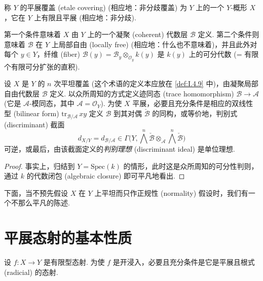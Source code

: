 \begin{definition}\label{def:I.4.9}
称 $Y$ 的平展覆盖 (etale covering) (相应地：非分歧覆盖) 为 $Y$ 上的一个 $Y$-概形 $X$，它在 $Y$ 上有限且平展 (相应地：非分歧).
\end{definition}

第一个条件意味着 $X$ 由 $Y$ 上的一个凝聚 (coherent) 代数层 $\mathcal{B}$ 定义. 第二个条件则意味着 $\mathcal{B}$ 在 $Y$ 上局部自由 (locally free) (相应地：什么也不意味着)，并且此外对每个 $y \in Y$，纤维 (fiber) $\mathcal{B}(y) = \mathcal{B}_y \otimes_{\mathcal{O}_y} k(y)$ 是 $k(y)$ 上的可分代数 (= 有限个有限可分扩张的直积).

\begin{proposition}\label{prop:I.4.10}
设 $X$ 是 $Y$ 的 $n$ 次平坦覆盖 (这个术语的定义本应放在 \ref{def:I.4.9} 中)，由凝聚局部自由代数层 $\mathcal{B}$ 定义. 以众所周知的方式定义迹同态 (trace homomorphism) $\mathcal{B} \to \mathcal{A}$ (它是 $\mathcal{A}$-模同态，其中 $\mathcal{A} = \mathcal{O}_Y$). 为使 $X$ 平展，必要且充分条件是相应的双线性型 (bilinear form) $\mathrm{tr}_{\mathcal{B}/\mathcal{A}}\, xy$ 定义 $\mathcal{B}$ 到其对偶 $\check{\mathcal{B}}$ 的同构，或等价地，判别式 (discriminant) 截面
\[
d_{X/Y} = d_{\mathcal{B}/\mathcal{A}} \in \Gamma\bigl(Y, \textstyle{\bigwedge^{n}} \check{\mathcal{B}} \otimes_{\mathcal{A}} \textstyle{\bigwedge^{n}} \check{\mathcal{B}}\bigr)
\]
可逆，或最后，由该截面定义的\emph{判别理想} (discriminant ideal) 是单位理想.
\end{proposition}

\begin{proof}
事实上，归结到 $Y = \mathrm{Spec}(k)$ 的情形，此时这是众所周知的可分性判则，通过 $k$ 的代数闭包 (algebraic closure) 即可平凡地看出.
\end{proof}

\begin{remarkstar}
下面，当不预先假设 $X$ 在 $Y$ 上平坦而只作正规性 (normality) 假设时，我们有一个不那么平凡的陈述.
\end{remarkstar}

\section{平展态射的基本性质}

\begin{theorem}\label{thm:I.5.1}
设 $f \colon X \to Y$ 是有限型态射. 为使 $f$ 是开浸入，必要且充分条件是它是平展且根式 (radicial) 的态射.
\end{theorem}

